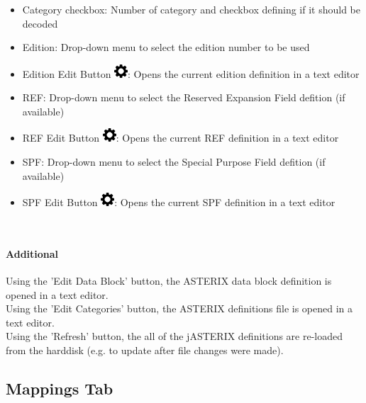 \begin{itemize}  
\item Category checkbox: Number of category and checkbox defining if it should be decoded
\item Edition: Drop-down menu to select the edition number to be used
\item Edition Edit Button \includegraphics[width=0.5cm]{../../data/icons/edit.png}: Opens the current edition definition in a text editor
\item REF: Drop-down menu to select the Reserved Expansion Field defition (if available)
\item REF Edit Button \includegraphics[width=0.5cm]{../../data/icons/edit.png}: Opens the current REF definition in a text editor
\item SPF: Drop-down menu to select the Special Purpose Field defition (if available)
\item SPF Edit Button \includegraphics[width=0.5cm]{../../data/icons/edit.png}: Opens the current SPF definition in a text editor
\end{itemize}
\ \\

\paragraph{Additional}

Using the 'Edit Data Block' button, the ASTERIX data block definition is opened in a text editor. \\

Using the 'Edit Categories' button, the ASTERIX definitions file is opened in a text editor. \\

Using the 'Refresh' button, the all of the jASTERIX definitions are re-loaded from the harddisk (e.g. to update after file changes were made). \\

\subsection{Mappings Tab}

